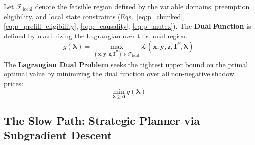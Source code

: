 \documentclass[11pt]{article}
\begin{document}
Let $\mathcal{F}_{\text{local}}$ denote the feasible region defined by the variable domains, preemption eligibility, and local state constraints (Eqs.~\ref{eq:p_chunked}, \ref{eq:p_prefill_eligibility}, \ref{eq:p_causality}, \ref{eq:p_mutex}). The \textbf{Dual Function} is defined by maximizing the Lagrangian over this local region:
\begin{equation}
    g(\boldsymbol{\lambda}) = \max_{(\mathbf{x}, \mathbf{y}, \mathbf{z}, \mathbf{I}^P) \in \mathcal{F}_{\text{local}}} \mathcal{L}(\mathbf{x}, \mathbf{y}, \mathbf{z}, \mathbf{I}^P, \boldsymbol{\lambda})
\end{equation}
The \textbf{Lagrangian Dual Problem} seeks the tightest upper bound on the primal optimal value by minimizing the dual function over all non-negative shadow prices:
\begin{equation}
    \min_{\boldsymbol{\lambda} \ge \mathbf{0}} g(\boldsymbol{\lambda})
\end{equation}

\subsection{The Slow Path: Strategic Planner via Subgradient Descent}
\label{subsec:slow_path}
\end{document}
